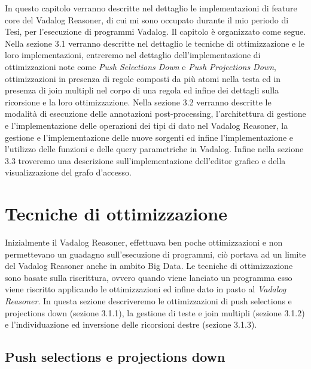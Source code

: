 In questo capitolo verranno descritte nel dettaglio le implementazioni di feature core del Vadalog Reasoner, di cui mi sono occupato durante il mio periodo di Tesi, per l'esecuzione di programmi Vadalog. \newline
Il capitolo è organizzato come segue. Nella sezione 3.1 verranno descritte nel dettaglio le tecniche di ottimizzazione e le loro implementazioni, entreremo nel dettaglio dell'implementazione di ottimizzazioni note come \emph{Push Selections Down} e \emph{Push Projections Down}, ottimizzazioni in presenza di regole composti da più atomi nella testa ed in presenza di join multipli nel corpo di una regola ed infine dei dettagli sulla ricorsione e la loro ottimizzazione. \newline
Nella sezione 3.2 verranno descritte le modalità di esecuzione delle annotazioni post-processing, l'architettura di gestione e l'implementazione delle operazioni dei tipi di dato nel Vadalog Reasoner, la gestione e l'implementazione delle nuove sorgenti ed infine l'implementazione e l'utilizzo delle funzioni e delle query parametriche in Vadalog. \newline
Infine nella sezione 3.3 troveremo una descrizione sull'implementazione dell'editor grafico e della visualizzazione del grafo d'accesso.

\section{Tecniche di ottimizzazione}

Inizialmente il Vadalog Reasoner, effettuava ben poche ottimizzazioni e non permettevano un guadagno sull'esecuzione di programmi, ciò portava ad un limite del Vadalog Reasoner anche in ambito Big Data. \newline
Le tecniche di ottimizzazione sono basate sulla riscrittura, ovvero quando viene lanciato un programma esso viene riscritto applicando le ottimizzazioni ed infine dato in pasto al \emph{Vadalog Reasoner}.
In questa sezione descriveremo le ottimizzazioni di push selections e projections down (sezione 3.1.1), la gestione di teste e join multipli (sezione 3.1.2) e l'individuazione ed inversione delle ricorsioni destre (sezione 3.1.3).

\subsection{Push selections e projections down}

